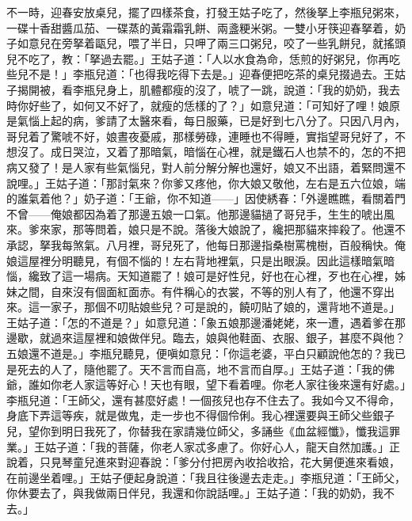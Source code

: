 不一時，迎春安放桌兒，擺了四樣茶食，打發王姑子吃了，然後拏上李瓶兒粥來，一碟十香甜醬瓜茄、一碟蒸的黃霜霜乳餅、兩盞粳米粥。一雙小牙筷迎春拏着，奶子如意兒在旁拏着甌兒，喂了半日，只呷了兩三口粥兒，咬了一些乳餅兒，就搖頭兒不吃了，教：「拏過去罷。」王姑子道：「人以水食為命，恁煎的好粥兒，你再吃些兒不是！」李瓶兒道：「也得我吃得下去是。」迎春便把吃茶的桌兒掇過去。王姑子揭開被，看李瓶兒身上，肌體都瘦的沒了，唬了一跳，說道：「我的奶奶，我去時你好些了，如何又不好了，就瘦的恁樣的了？」如意兒道：「可知好了哩！娘原是氣惱上起的病，爹請了太醫來看，每日服藥，已是好到七八分了。只因八月內，哥兒着了驚唬不好，娘晝夜憂戚，那樣勞碌，連睡也不得睡，實指望哥兒好了，不想沒了。成日哭泣，又着了那暗氣，暗惱在心裡，就是鐵石人也禁不的，怎的不把病又發了！是人家有些氣惱兒，對人前分解分解也還好，娘又不出語，着緊問還不說哩。」{}王姑子道：「那討氣來？你爹又疼他，你大娘又敬他，左右是五六位娘，端的誰氣着他？」奶子道：「王爺，你不知道——」因使綉春：「外邊瞧瞧，{}看關着門不曾——俺娘都因為着了那邊五娘一口氣。他那邊貓撾了哥兒手，生生的唬出風來。爹來家，那等問着，娘只是不說。落後大娘說了，纔把那貓來摔殺了。他還不承認，拏我每煞氣。八月裡，哥兒死了，他每日那邊指桑樹罵槐樹，百般稱快。俺娘這屋裡分明聽見，有個不惱的！左右背地裡氣，只是出眼淚。因此這樣暗氣暗惱，纔致了這一場病。天知道罷了！娘可是好性兒，好也在心裡，歹也在心裡，姊妹之間，自來沒有個面紅面赤。有件稱心的衣裳，不等的別人有了，他還不穿出來。這一家子，那個不叨貼娘些兒？可是說的，饒叨貼了娘的，還背地不道是。」{}王姑子道：「怎的不道是？」如意兒道：「象五娘那邊潘姥姥，來一遭，遇着爹在那邊歇，就過來這屋裡和娘做伴兒。臨去，娘與他鞋面、衣服、銀子，甚麼不與他？五娘還不道是。」李瓶兒聽見，便嗔如意兒：「你這老婆，平白只顧說他怎的？我已是死去的人了，隨他罷了。天不言而自高，地不言而自厚。」{}王姑子道：「我的佛爺，誰如你老人家這等好心！天也有眼，望下看着哩。你老人家往後來還有好處。」李瓶兒道：「王師父，還有甚麼好處！一個孩兒也存不住去了。我如今又不得命，身底下弄這等疾，就是做鬼，走一步也不得個伶俐。我心裡還要與王師父些銀子兒，望你到明日我死了，你替我在家請幾位師父，多誦些《血盆經懺》，懺我這罪業。」王姑子道：「我的菩薩，你老人家忒多慮了。你好心人，龍天自然加護。」正說着，只見琴童兒進來對迎春說：「爹分付把房內收拾收拾，花大舅便進來看娘，在前邊坐着哩。」王姑子便起身說道：「我且往後邊去走走。」李瓶兒道：「王師父，你休要去了，與我做兩日伴兒，我還和你說話哩。」王姑子道：「我的奶奶，我不去。」

